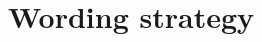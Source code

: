 \documentclass{wg21}
\begin{document}
%
%
%
%
%
%

%
%
%

\section{Wording strategy}
\end{document}
